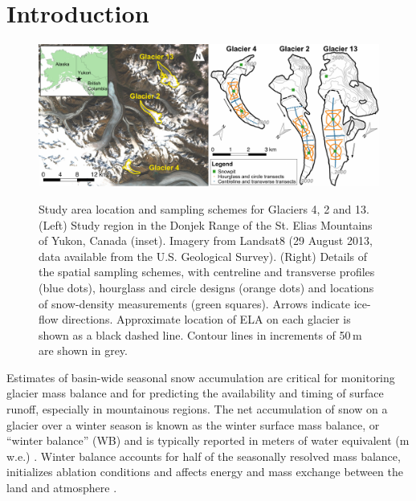 \documentclass[twocolumn,letterpaper]{igs}
\begin{document}
\maketitle

\section{Introduction}

\begin{figure}
	\centering
	\includegraphics[width =\textwidth]{PaperII-StudySite.pdf}\\
	\caption{Study area location and sampling schemes for Glaciers 4, 2 and 13. (Left) Study region in the Donjek Range of the St. Elias Mountains of Yukon, Canada (inset). Imagery from Landsat8 (29 August 2013, data available from the U.S. Geological Survey). (Right) Details of the spatial sampling schemes, with centreline and transverse profiles (blue dots), hourglass and circle designs (orange dots) and locations of snow-density measurements (green squares). Arrows indicate ice-flow directions. Approximate location of ELA on each glacier is shown as a black dashed line. Contour lines in increments of 50\,m are shown in grey.}
	\label{fig:Sampling}
\end{figure} 

Estimates of basin-wide seasonal snow accumulation are critical for monitoring glacier mass balance and for predicting the availability and timing of surface runoff, especially in mountainous regions. The net accumulation of snow on a glacier over a winter season is known as the winter surface mass balance, or ``winter balance'' (WB) and is typically reported in meters of water equivalent (m\,w.e.) \citep{Cogley2011}. Winter balance accounts for half of the seasonally resolved mass balance, initializes ablation conditions and affects energy and mass exchange between the land and atmosphere \citep[e.g.][]{Hock2005, Reveillet2016}. 
\end{document}

